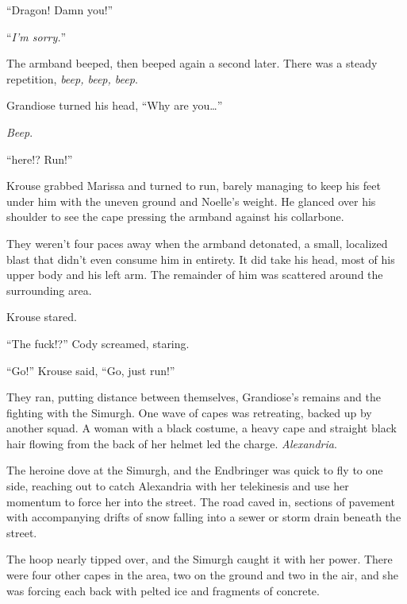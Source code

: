 ``Dragon!  Damn you!''



``\emph{I'm sorry.}''



The armband beeped, then beeped again a second later.  There was a steady repetition, \emph{beep, beep, beep}.



Grandiose turned his head, ``Why are you\ldots''



\emph{Beep}.



``\ldotsStill here!?  Run!''



Krouse grabbed Marissa and turned to run, barely managing to keep his feet under him with the uneven ground and Noelle's weight.  He glanced over his shoulder to see the cape pressing the armband against his collarbone.



They weren't four paces away when the armband detonated, a small, localized blast that didn't even consume him in entirety.  It did take his head, most of his upper body and his left arm.  The remainder of him was scattered around the surrounding area.



Krouse stared.



``The fuck!?'' Cody screamed, staring.



``Go!'' Krouse said, ``Go, just run!''



They ran, putting distance between themselves, Grandiose's remains and the fighting with the Simurgh.  One wave of capes was retreating, backed up by another squad.  A woman with a black costume, a heavy cape and straight black hair flowing from the back of her helmet led the charge.  \emph{Alexandria}.



The heroine dove at the Simurgh, and the Endbringer was quick to fly to one side, reaching out to catch Alexandria with her telekinesis and use her momentum to force her into the street.  The road caved in, sections of pavement with accompanying drifts of snow falling into a sewer or storm drain beneath the street.



The hoop nearly tipped over, and the Simurgh caught it with her power.  There were four other capes in the area, two on the ground and two in the air, and she was forcing each back with pelted ice and fragments of concrete.



